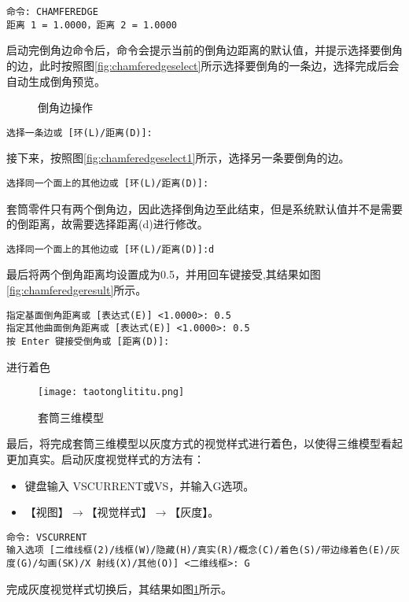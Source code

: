 \begin{procedure}
\begin{lstlisting}
命令: CHAMFEREDGE
距离 1 = 1.0000，距离 2 = 1.0000
\end{lstlisting}
启动完倒角边命令后，命令会提示当前的倒角边距离的默认值，并提示选择要倒角的边，此时按照图\ref{fig:chamferedgeselect}所示选择要倒角的一条边，选择完成后会自动生成倒角预览。
\begin{figure}[htbp]
\centering
{}\hspace{20pt}
\hspace{20pt}
\caption{倒角边操作}
\end{figure}
\begin{lstlisting}
选择一条边或 [环(L)/距离(D)]:
\end{lstlisting}
接下来，按照图\ref{fig:chamferedgeselect1}所示，选择另一条要倒角的边。
\begin{lstlisting}
选择同一个面上的其他边或 [环(L)/距离(D)]:
\end{lstlisting}
套筒零件只有两个倒角边，因此选择倒角边至此结束，但是系统默认值并不是需要的倒距离，故需要选择距离(d)进行修改。
\begin{lstlisting}
选择同一个面上的其他边或 [环(L)/距离(D)]:d
\end{lstlisting}
最后将两个倒角距离均设置成为0.5，并用回车键接受,其结果如图\ref{fig:chamferedgeresult}所示。
\begin{lstlisting}
指定基面倒角距离或 [表达式(E)] <1.0000>: 0.5
指定其他曲面倒角距离或 [表达式(E)] <1.0000>: 0.5
按 Enter 键接受倒角或 [距离(D)]:
\end{lstlisting}
\item 进行着色
\begin{figure}[htbp]
\centering
\texttt{[image: taotonglititu.png]}
\caption{套筒三维模型}\label{fig:taotonglititu}
\end{figure}
最后，将完成套筒三维模型以灰度方式的视觉样式进行着色，以使得三维模型看起更加真实。启动灰度视觉样式的方法有：
\begin{itemize}
\item 键盘输入 VSCURRENT或VS，并输入G选项。
\item 【视图】$\rightarrow$【视觉样式】$\rightarrow$【灰度】。
\end{itemize}
\begin{lstlisting}
命令: VSCURRENT
输入选项 [二维线框(2)/线框(W)/隐藏(H)/真实(R)/概念(C)/着色(S)/带边缘着色(E)/灰度(G)/勾画(SK)/X 射线(X)/其他(O)] <二维线框>: G
\end{lstlisting}
完成灰度视觉样式切换后，其结果如图\ref{fig:taotonglititu}所示。


\end{procedure}
